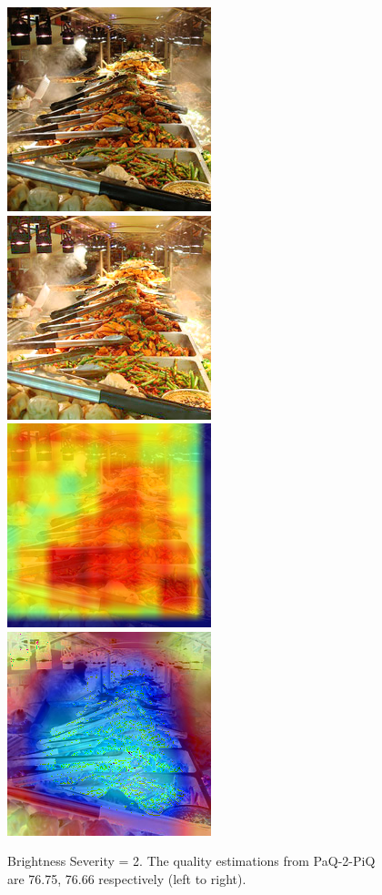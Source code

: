 \documentclass[10pt,twocolumn,letterpaper]{article}
\begin{document}
\begin{figure}[!ht]
	\includegraphics[width=.49\columnwidth]{Images/test_images/severity=0/buffet.png}\hfill
	\includegraphics[width=.49\columnwidth]{Images/test_images/severity=2/brightness/buffet.png}\hfill
	\\[\smallskipamount]
    \includegraphics[width=.49\columnwidth]{Images/saliency_maps/paq2piq/severity=2/brightness/buffet.png}\hfill
	\includegraphics[width=.49\columnwidth]{Images/saliency_maps/resnet18/severity=2/brightness/buffet.png}\hfill
	\caption{Brightness Severity = 2. The quality estimations from PaQ-2-PiQ are 76.75, 76.66 respectively (left to right).}
\end{figure}
\end{document}
